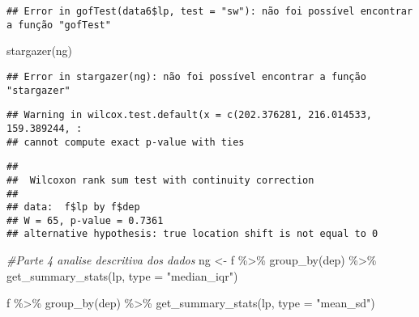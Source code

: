 \documentclass[
]{article}
\newenvironment{Shaded}{\begin{snugshade}}{\end{snugshade}}
\newcommand{\AttributeTok}[1]{\textcolor[rgb]{0.77,0.63,0.00}{#1}}
\newcommand{\CommentTok}[1]{\textcolor[rgb]{0.56,0.35,0.01}{\textit{#1}}}
\newcommand{\DecValTok}[1]{\textcolor[rgb]{0.00,0.00,0.81}{#1}}
\newcommand{\FunctionTok}[1]{\textcolor[rgb]{0.00,0.00,0.00}{#1}}
\newcommand{\NormalTok}[1]{#1}
\newcommand{\OtherTok}[1]{\textcolor[rgb]{0.56,0.35,0.01}{#1}}
\newcommand{\SpecialCharTok}[1]{\textcolor[rgb]{0.00,0.00,0.00}{#1}}
\newcommand{\StringTok}[1]{\textcolor[rgb]{0.31,0.60,0.02}{#1}}
\begin{document}
\begin{verbatim}
## Error in gofTest(data6$lp, test = "sw"): não foi possível encontrar a função "gofTest"
\end{verbatim}

\begin{Shaded}
\begin{Highlighting}[]
\FunctionTok{stargazer}\NormalTok{(ng)}
\end{Highlighting}
\end{Shaded}

\begin{verbatim}
## Error in stargazer(ng): não foi possível encontrar a função "stargazer"
\end{verbatim}

\begin{Shaded}
\end{Shaded}

\begin{verbatim}
## Warning in wilcox.test.default(x = c(202.376281, 216.014533, 159.389244, :
## cannot compute exact p-value with ties
\end{verbatim}

\begin{verbatim}
## 
##  Wilcoxon rank sum test with continuity correction
## 
## data:  f$lp by f$dep
## W = 65, p-value = 0.7361
## alternative hypothesis: true location shift is not equal to 0
\end{verbatim}

\begin{Shaded}
\begin{Highlighting}[]
\CommentTok{\#Parte 4 analise descritiva dos dados}
\NormalTok{ng }\OtherTok{\textless{}{-}}\NormalTok{ f }\SpecialCharTok{\%\textgreater{}\%} \FunctionTok{group\_by}\NormalTok{(dep) }\SpecialCharTok{\%\textgreater{}\%} 
  \FunctionTok{get\_summary\_stats}\NormalTok{(lp, }\AttributeTok{type =} \StringTok{"median\_iqr"}\NormalTok{)}

\NormalTok{f }\SpecialCharTok{\%\textgreater{}\%} \FunctionTok{group\_by}\NormalTok{(dep) }\SpecialCharTok{\%\textgreater{}\%} 
  \FunctionTok{get\_summary\_stats}\NormalTok{(lp, }\AttributeTok{type =} \StringTok{"mean\_sd"}\NormalTok{)}
\end{Highlighting}
\end{Shaded}
\end{document}
